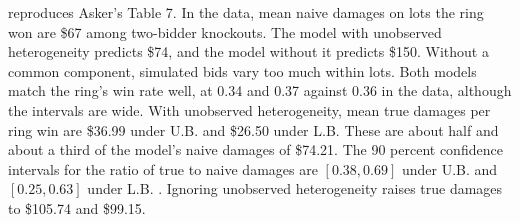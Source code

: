  reproduces Asker's Table 7. In the data, mean naive damages on lots the ring won are \$67
among two-bidder knockouts. The model with unobserved heterogeneity predicts \$74, and the model without it
predicts \$150. Without a common component, simulated bids vary too much within lots. Both models match the
ring's win rate well, at 0.34 and 0.37 against 0.36 in the data, although the intervals are wide. With
unobserved heterogeneity, mean true damages per ring win are \$36.99 under U.B. and \$26.50 under L.B. These are
about half and about a third of the model's naive damages of \$74.21. The 90 percent confidence intervals for the
ratio of true to naive damages are $[0.38,0.69]$ under U.B. and $[0.25,0.63]$ under L.B. \citep[footnote
47]{Asker2010}. Ignoring unobserved heterogeneity raises true damages to \$105.74 and \$99.15.

